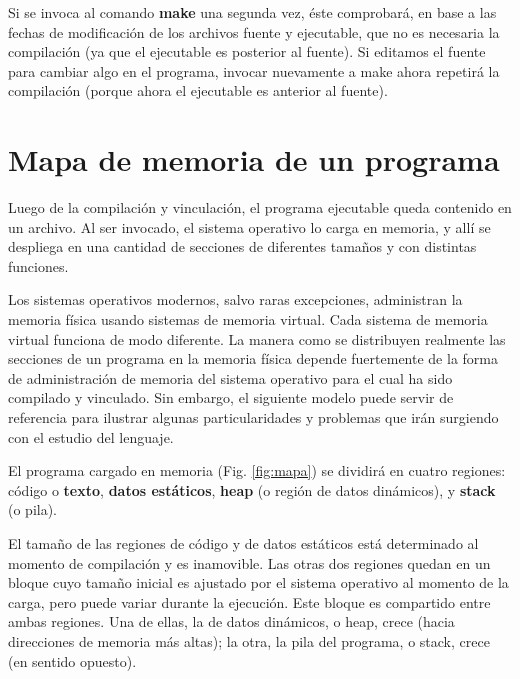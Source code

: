 Si se invoca al comando \textbf{make} una segunda vez, éste comprobará, en base a las fechas de
modificación de los archivos fuente y ejecutable, que no es necesaria la compilación (ya que el
ejecutable es posterior al fuente). Si editamos el fuente para cambiar algo en el programa, invocar
nuevamente a make ahora repetirá la compilación (porque ahora el ejecutable es anterior al fuente).



\section{Mapa de memoria de un programa}
Luego de la compilación y vinculación, el programa ejecutable queda contenido en un archivo. Al ser invocado, el sistema operativo lo carga en memoria, y allí se despliega en una cantidad de secciones de diferentes tamaños y con distintas funciones. 

Los sistemas operativos modernos, salvo raras excepciones, administran la memoria física  usando sistemas de memoria virtual. Cada sistema de memoria virtual funciona de modo diferente. La manera como se distribuyen realmente las secciones de un programa en la memoria física depende fuertemente de la
forma de administración de memoria del sistema operativo para el cual ha sido compilado y vinculado. Sin embargo,
el siguiente modelo puede servir de referencia para ilustrar algunas particularidades y problemas
que irán surgiendo con el estudio del lenguaje.

El programa cargado en memoria (Fig. \ref{fig:mapa}) se dividirá en cuatro regiones: código o \textbf{texto}, \textbf{datos
estáticos}, \textbf{heap} (o región de datos dinámicos), y \textbf{stack} (o pila). 

El tamaño de las regiones de código y de datos estáticos está determinado al momento de compilación
y es inamovible. Las otras dos regiones quedan en un bloque cuyo tamaño inicial es ajustado por el
sistema operativo al momento de la carga, pero puede variar durante la ejecución. Este bloque es
compartido entre ambas regiones. Una de ellas, la de datos dinámicos, o heap, crece  (hacia 
direcciones de memoria más altas); la otra, la pila del programa, o stack, crece  (en
sentido opuesto).



